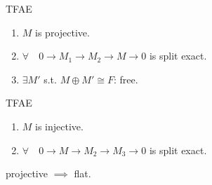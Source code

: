 \begin{prop}
  TFAE
  \begin{enumerate}
    \item $M$ is projective.
    \item $\forall \quad 0 \to M_1 \to M_2 \to M \to 0$ is split exact.
    \item $\exists M'$ s.t. $M \oplus M' \cong F$: free.
  \end{enumerate}
\end{prop}

\begin{prop}
  TFAE
  \begin{enumerate}
    \item $M$ is injective.
    \item $\forall \quad 0 \to M \to M_2 \to M_3 \to 0$ is split exact.
  \end{enumerate}
\end{prop}

\begin{prop}
  projective $\implies$ flat.
\end{prop}


